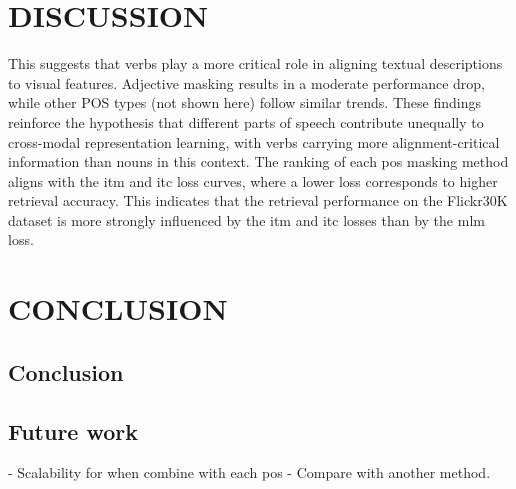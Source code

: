 \chapter{DISCUSSION}
This suggests that verbs play a more critical role in aligning textual descriptions to visual features.
Adjective masking results in a moderate performance drop, while other POS types (not shown here) follow similar trends.
These findings reinforce the hypothesis that different parts of speech contribute unequally to cross-modal representation learning, with verbs carrying more alignment-critical information than nouns in this context.
The ranking of each \acrshort{pos} masking method aligns with the \acrshort{itm} and \acrshort{itc} loss curves, where a lower loss corresponds to higher retrieval accuracy.
This indicates that the retrieval performance on the Flickr30K dataset is more strongly influenced by the \acrshort{itm} and \acrshort{itc} losses than by the \acrshort{mlm} loss.

\chapter{CONCLUSION}
\section{Conclusion}
\section{Future work}
- Scalability for when combine with each pos
- Compare with another method.